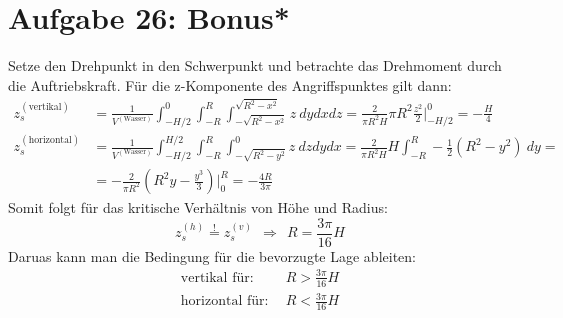\documentclass[a4paper,12pt]{article}
\begin{document}
\section*{Aufgabe 26: Bonus*}
%
%
Setze den Drehpunkt in den Schwerpunkt und betrachte das Drehmoment durch die Auftriebskraft. Für die z-Komponente des Angriffspunktes gilt dann:
\begin{align*}
z_s^{(\mathrm{vertikal})}&=\frac{1}{V^{(\mathrm{Wasser})}}\int_{-H/2}^{0}\int_{-R}^{R}\int_{-\sqrt{R^2-x^2}}^{\sqrt{R^2-x^2}} z\ dydxdz=\frac{2}{\pi R^2H}\pi R^2 \frac{z^2}{2}\bigg\vert_{-H/2}^{0}=-\frac{H}{4}\\
z_s^{(\mathrm{horizontal})}&=\frac{1}{V^{(\mathrm{Wasser})}}\int_{-H/2}^{H/2}\int_{-R}^{R}\int_{-\sqrt{R^2-y^2}}^{0} z\ dzdydx = \frac{2}{\pi R^2H}H\int_{-R}^{R} -\frac12 (R^2-y^2)\ dy =\\
&=-\frac{2}{\pi R^2}(R^2y-\frac{y^3}{3})\bigg\vert_0^{R}=-\frac{4R}{3\pi}
\end{align*}
Somit folgt für das kritische Verhältnis von Höhe und Radius:
$$ z_s^{(h)}\overset{!}{=}z_s^{(v)}\ \ \Rightarrow\ \ R=\frac{3\pi}{16}H $$
Daruas kann man die Bedingung für die bevorzugte Lage ableiten:
\begin{align*}
\textrm{vertikal für:}&\ \ R>\frac{3\pi}{16}H\\
\textrm{horizontal für:}&\ \ R<\frac{3\pi}{16}H
\end{align*}
\end{document}
